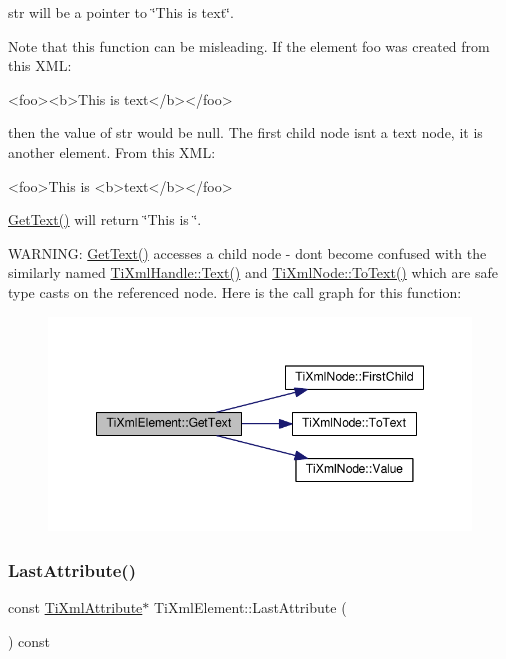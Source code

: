 \textquotesingle{}str\textquotesingle{} will be a pointer to \char`\"{}\+This is text\char`\"{}.

Note that this function can be misleading. If the element foo was created from this X\+ML\+: \begin{DoxyVerb}<foo><b>This is text</b></foo> 
\end{DoxyVerb}


then the value of str would be null. The first child node isn\textquotesingle{}t a text node, it is another element. From this X\+ML\+: \begin{DoxyVerb}<foo>This is <b>text</b></foo> 
\end{DoxyVerb}
 \hyperlink{class_ti_xml_element_af0f814ecbd43d50d4cdbdf4354d3da39}{Get\+Text()} will return \char`\"{}\+This is \char`\"{}.

W\+A\+R\+N\+I\+NG\+: \hyperlink{class_ti_xml_element_af0f814ecbd43d50d4cdbdf4354d3da39}{Get\+Text()} accesses a child node -\/ don\textquotesingle{}t become confused with the similarly named \hyperlink{class_ti_xml_handle_ad3b502c72059421e4dfcc7bda3c392fe}{Ti\+Xml\+Handle\+::\+Text()} and \hyperlink{class_ti_xml_node_a3ddfbcac78fbea041fad57e5c6d60a03}{Ti\+Xml\+Node\+::\+To\+Text()} which are safe type casts on the referenced node. Here is the call graph for this function\+:\nopagebreak
\begin{figure}[H]
\begin{center}
\leavevmode
\includegraphics[width=348pt]{class_ti_xml_element_af0f814ecbd43d50d4cdbdf4354d3da39_cgraph}
\end{center}
\end{figure}
\mbox{\label{class_ti_xml_element_a42939f55ed4cec5fc1daaecfded7ba16}} 
\subsubsection{\texorpdfstring{Last\+Attribute()}{LastAttribute()}\hspace{0.1cm}{\footnotesize\ttfamily [1/2]}}
{\footnotesize\ttfamily const \hyperlink{class_ti_xml_attribute}{Ti\+Xml\+Attribute}$\ast$ Ti\+Xml\+Element\+::\+Last\+Attribute (\begin{DoxyParamCaption}{ }\end{DoxyParamCaption}) const\hspace{0.3cm}{\ttfamily [inline]}}



